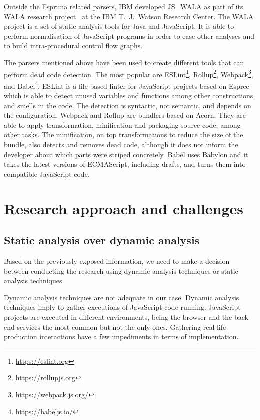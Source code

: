 \documentclass{uvamscse}
\begin{document}
Outside the Esprima related parsers, IBM developed JS\_WALA \cite{JSWALA} as part of its WALA research project~\cite{WALA} at the IBM T.\ J.\ Watson Research Center. The WALA project is a set of static analysis tools for Java and JavaScript. It is able to perform normalisation of JavaScript programs in order to ease other analyses and to build intra-procedural control flow graphs.

The parsers mentioned above have been used to create different tools that can perform dead code detection. The most popular are ESLint\footnote{\url{https://eslint.org}}, Rollup\footnote{\url{https://rollupjs.org}}, Webpack\footnote{\url{https://webpack.js.org/}}, and Babel\footnote{\url{https://babeljs.io/}}. ESLint is a file-based linter for JavaScript projects based on Espree which is able to detect unused variables and functions among other constructions and smells in the code. The detection is syntactic, not semantic, and depends on the configuration. Webpack and Rollup are bundlers based on Acorn. They are able to apply transformation, minification and packaging source code, among other tasks. The minification, on top transformations to reduce the size of the bundle, also detects and removes dead code, although it does not inform the developer about which parts were striped concretely. Babel uses Babylon and it takes the latest versions of ECMAScript, including drafts, and turns them into compatible JavaScript code.

\chapter{Research approach and challenges}
\section{Static analysis over dynamic analysis}
Based on the previously exposed information, we need to make a decision between conducting the research using dynamic analysis techniques or static analysis techniques.

Dynamic analysis techniques are not adequate in our case. Dynamic analysis techniques imply to gather executions of JavaScript code running. JavaScript projects are executed in different environments, being the browser and the back end services the most common but not the only ones. Gathering real life production interactions have a few impediments in terms of implementation. 
\end{document}
